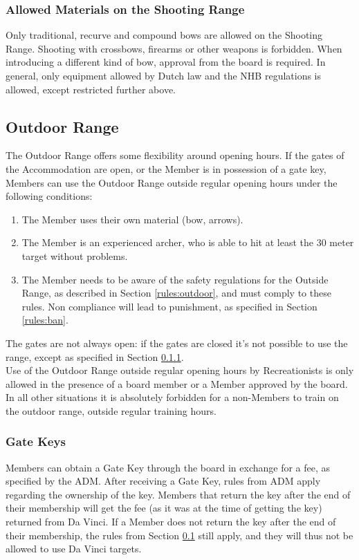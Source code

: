 \documentclass[a4paper]{article}
\begin{document}
\subsubsection{Allowed Materials on the Shooting Range}
Only traditional, recurve and compound bows are allowed on the Shooting Range. Shooting with crossbows, firearms or other weapons is forbidden. When introducing a different kind of bow, approval from the board is required. In general, only equipment allowed by Dutch law and the { NHB} regulations is allowed, except restricted further above.

\subsection{Outdoor Range}
\label{section:outdoor}
The Outdoor Range offers some flexibility around opening hours. If the gates of the { Accommodation} are open, or the { Member} is in possession of a gate key, { Members} can use the Outdoor Range outside regular opening hours under the following conditions:

\begin{enumerate}
\item The { Member} uses their own material (bow, arrows).
\item The { Member} is an { experienced} { archer}, who is able to hit at least the 30 meter target without problems.
\item The { Member} needs to be aware of the safety regulations for the Outside Range, as described in Section \ref{rules:outdoor}, and must comply to these rules. Non compliance will lead to punishment, as specified in Section \ref{rules:ban}.
\end{enumerate}

The gates are not always open: if the gates are closed it’s not possible to use the range, except as specified in Section \ref{sec:gatekey}. \\

Use of the Outdoor Range outside regular opening hours by { Recreationists} is only allowed in the presence of a board member or a { Member} approved by the board. In all other situations it is absolutely forbidden for a non-{ Members} to train on the outdoor range, outside regular training hours. 

\subsubsection{Gate Keys}
\label{sec:gatekey}
{ Members} can obtain a Gate Key through the board in exchange for a fee, as specified by the { ADM}. After receiving a Gate Key, rules from { ADM} apply regarding the ownership of the key. { Members} that return the key after the end of their membership will get the fee (as it was at the time of getting the key) returned from Da Vinci. If a { Member} does not return the key after the end of their membership, the rules from Section \ref{section:outdoor} still apply, and they will thus not be allowed to use Da Vinci targets.
\end{document}
